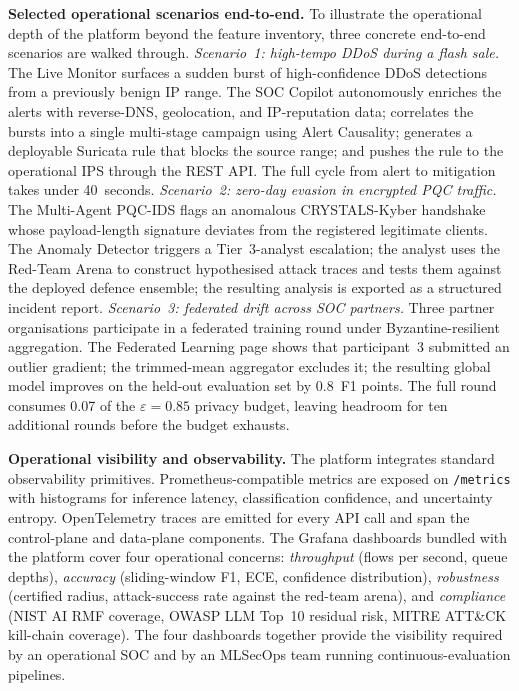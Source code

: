 \noindent\textbf{Selected operational scenarios end-to-end.} To illustrate the operational depth of the platform beyond the feature inventory, three concrete end-to-end scenarios are walked through. \emph{Scenario~1: high-tempo DDoS during a flash sale.} The Live Monitor surfaces a sudden burst of high-confidence DDoS detections from a previously benign IP range. The SOC Copilot autonomously enriches the alerts with reverse-DNS, geolocation, and IP-reputation data; correlates the bursts into a single multi-stage campaign using Alert Causality; generates a deployable Suricata rule that blocks the source range; and pushes the rule to the operational IPS through the REST API. The full cycle from alert to mitigation takes under 40~seconds. \emph{Scenario~2: zero-day evasion in encrypted PQC traffic.} The Multi-Agent PQC-IDS flags an anomalous CRYSTALS-Kyber handshake whose payload-length signature deviates from the registered legitimate clients. The Anomaly Detector triggers a Tier~3-analyst escalation; the analyst uses the Red-Team Arena to construct hypothesised attack traces and tests them against the deployed defence ensemble; the resulting analysis is exported as a structured incident report. \emph{Scenario~3: federated drift across SOC partners.} Three partner organisations participate in a federated training round under Byzantine-resilient aggregation. The Federated Learning page shows that participant~3 submitted an outlier gradient; the trimmed-mean aggregator excludes it; the resulting global model improves on the held-out evaluation set by 0.8~F1 points. The full round consumes 0.07 of the $\varepsilon{=}0.85$ privacy budget, leaving headroom for ten additional rounds before the budget exhausts.

\noindent\textbf{Operational visibility and observability.} The platform integrates standard observability primitives. Prometheus-compatible metrics are exposed on \texttt{/metrics} with histograms for inference latency, classification confidence, and uncertainty entropy. OpenTelemetry traces are emitted for every API call and span the control-plane and data-plane components. The Grafana dashboards bundled with the platform cover four operational concerns: \emph{throughput} (flows per second, queue depths), \emph{accuracy} (sliding-window F1, ECE, confidence distribution), \emph{robustness} (certified radius, attack-success rate against the red-team arena), and \emph{compliance} (NIST AI RMF coverage, OWASP LLM Top~10 residual risk, MITRE ATT\&CK kill-chain coverage). The four dashboards together provide the visibility required by an operational SOC and by an MLSecOps team running continuous-evaluation pipelines.

